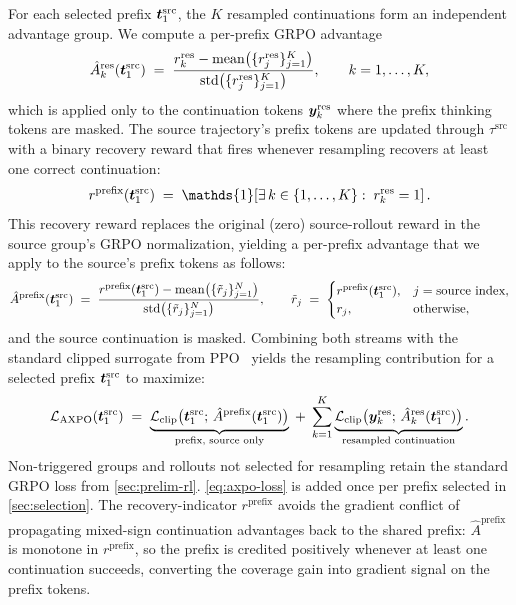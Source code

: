 For each selected prefix ${\bm{t}}_1^{\text{src}}$, the $K$ resampled continuations form an independent advantage group. We compute a per-prefix GRPO advantage
\begin{equation}
\label{eq:axpo-adv}
\hat{A}_k^{\text{res}}({\bm{t}}_1^{\text{src}}) \;=\; \frac{r_k^{\text{res}} - \mathrm{mean}\bigl(\{r_j^{\text{res}}\}_{j=1}^K\bigr)}{\mathrm{std}\bigl(\{r_j^{\text{res}}\}_{j=1}^K\bigr)}, \qquad k = 1, \ldots, K,
\end{equation}
which is applied only to the continuation tokens ${\bm{y}}_k^{\text{res}}$ where the prefix thinking tokens are masked. The source trajectory's prefix tokens are updated through $\tau^{\text{src}}$ with a binary recovery reward that fires whenever resampling recovers at least one correct continuation:
\begin{equation}
\label{eq:axpo-recovery}
r^{\text{prefix}}(\vt_1^{\text{src}}) \;=\; \mathds{1}\!\left[\exists\, k \in \{1,\ldots,K\}:\; r_k^{\text{res}} = 1\right].
\end{equation}
This recovery reward replaces the original (zero) source-rollout reward in the source group's GRPO normalization, yielding a per-prefix advantage that we apply to the source's prefix tokens as follows:
\begin{equation}
\label{eq:axpo-prefix-adv}
\hat{A}^{\text{prefix}}({\bm{t}}_1^{\text{src}}) \;=\; \frac{r^{\text{prefix}}({\bm{t}}_1^{\text{src}}) - \mathrm{mean}\bigl(\{\tilde r_j\}_{j=1}^N\bigr)}{\mathrm{std}\bigl(\{\tilde r_j\}_{j=1}^N\bigr)},
\qquad
\tilde r_j \;=\; \begin{cases} r^{\text{prefix}}({\bm{t}}_1^{\text{src}}), & j = \text{source index}, \\ r_j, & \text{otherwise}, \end{cases}
\end{equation}
and the source continuation is masked. Combining both streams with the standard clipped surrogate from PPO~\citep{PPO} yields the resampling contribution for a selected prefix ${\bm{t}}_1^{\text{src}}$ to maximize:
\begin{equation}
\label{eq:axpo-loss}
\mathcal{L}_{\text{AXPO}}({\bm{t}}_1^{\text{src}}) \;=\; \underbrace{\mathcal{L}_{\text{clip}}\bigl({\bm{t}}_1^{\text{src}};\, \hat{A}^{\text{prefix}}({\bm{t}}_1^{\text{src}})\bigr)}_{\text{prefix, source only}} \;+\; \sum_{k=1}^{K}\underbrace{\mathcal{L}_{\text{clip}}\bigl({\bm{y}}_k^{\text{res}};\, \hat{A}_k^{\text{res}}({\bm{t}}_1^{\text{src}})\bigr)}_{\text{resampled continuation}}.
\end{equation}
Non-triggered groups and rollouts not selected for resampling retain the standard GRPO loss from \autoref{sec:prelim-rl}.
\autoref{eq:axpo-loss} is added once per prefix selected in \autoref{sec:selection}.
The recovery-indicator $r^{\text{prefix}}$ avoids the gradient conflict of propagating mixed-sign continuation advantages back to the shared prefix: $\hat{A}^{\text{prefix}}$ is monotone in $r^{\text{prefix}}$, so the prefix is credited positively whenever at least one continuation succeeds, converting the coverage gain into gradient signal on the prefix tokens.

